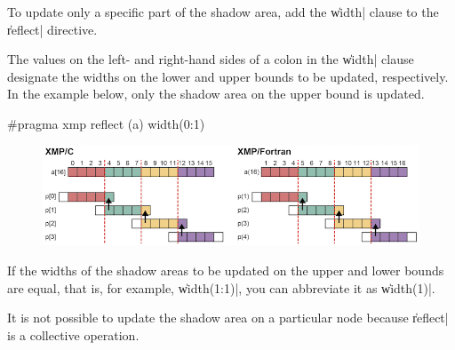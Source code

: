To update only a specific part of the shadow area, add the \|width|
clause to the \|reflect| directive.

The values on the left- and right-hand sides of a colon in the \|width|
clause designate the widths on the lower and upper bounds to be updated,
respectively. In the example below, only the shadow area on the upper
bound is updated.

\begin{XCexample}
#pragma xmp reflect (a) width(0:1)
\end{XCexample}


\begin{figure}
  \centering
  \includegraphics[width=\textwidth]{figs/reflect_width.png}
\end{figure}

\begin{mynote}
  If the widths of the shadow areas to be updated on the upper and lower 
  bounds are equal, that is, for example, \|width(1:1)|, you can
  abbreviate it as \|width(1)|.
\end{mynote}

\begin{mynote}
  It is not possible to update the shadow area on a particular node
  because \|reflect| is a collective operation.
\end{mynote}




